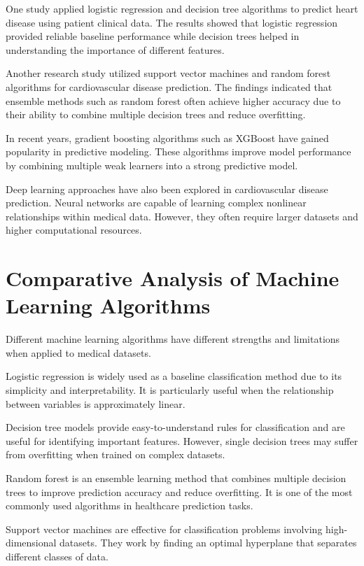 One study applied logistic regression and decision tree algorithms to predict heart disease using patient clinical data. The results showed that logistic regression provided reliable baseline performance while decision trees helped in understanding the importance of different features.

Another research study utilized support vector machines and random forest algorithms for cardiovascular disease prediction. The findings indicated that ensemble methods such as random forest often achieve higher accuracy due to their ability to combine multiple decision trees and reduce overfitting.

In recent years, gradient boosting algorithms such as XGBoost have gained popularity in predictive modeling. These algorithms improve model performance by combining multiple weak learners into a strong predictive model.

Deep learning approaches have also been explored in cardiovascular disease prediction. Neural networks are capable of learning complex nonlinear relationships within medical data. However, they often require larger datasets and higher computational resources.

\section{Comparative Analysis of Machine Learning Algorithms}

Different machine learning algorithms have different strengths and limitations when applied to medical datasets.

Logistic regression is widely used as a baseline classification method due to its simplicity and interpretability. It is particularly useful when the relationship between variables is approximately linear.

Decision tree models provide easy-to-understand rules for classification and are useful for identifying important features. However, single decision trees may suffer from overfitting when trained on complex datasets.

Random forest is an ensemble learning method that combines multiple decision trees to improve prediction accuracy and reduce overfitting. It is one of the most commonly used algorithms in healthcare prediction tasks.

Support vector machines are effective for classification problems involving high-dimensional datasets. They work by finding an optimal hyperplane that separates different classes of data.

